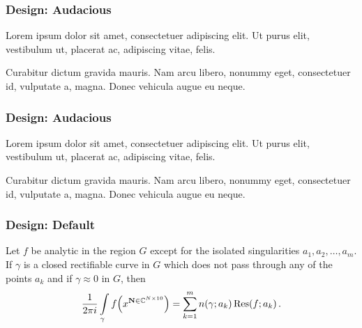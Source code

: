 \documentclass{ltx-talk-au}
\DeclareMathOperator\Res{Res}
\begin{document}
\begin{frame}[design=audacious]
  \frametitle{Design: Audacious}

  Lorem ipsum dolor sit amet, consectetuer adipiscing elit. Ut purus elit,
  vestibulum ut, placerat ac, adipiscing vitae, felis.

  Curabitur dictum gravida mauris. Nam arcu libero, nonummy eget, consectetuer
  id, vulputate a, magna. Donec vehicula augue eu neque.
\end{frame}

\begin{frame}[design=audacious, theme=brightblue]
  \frametitle{Design: Audacious}

  Lorem ipsum dolor sit amet, consectetuer adipiscing elit. Ut purus elit,
  vestibulum ut, placerat ac, adipiscing vitae, felis.

  Curabitur dictum gravida mauris. Nam arcu libero, nonummy eget, consectetuer
  id, vulputate a, magna. Donec vehicula augue eu neque.
\end{frame}

\begin{frame}
  \frametitle{Design: Default}
  Let $f$ be analytic in the region $G$ except for the isolated singularities
  $a_1,a_2,\dots,a_m$. If $\gamma$ is a closed rectifiable curve in $G$ which
  does not pass through any of the points $a_k$ and if $\gamma\approx 0$ in
  $G$, then
  \[
    \frac{1}{2\pi i} \int\limits_\gamma
    f\Bigl(x^{\mathbf{N}\in\mathbb{C}^{N\times 10}}\Bigr) = \sum_{k=1}^m
    n(\gamma;a_k)\Res(f;a_k)\,.
  \]
\end{frame}

\begin{frame}[design=cover, grid]
  \thispagestyle{plain}
\end{frame}

\begin{frame}[grid=true]
  \thispagestyle{plain}
\end{frame}
\end{document}
